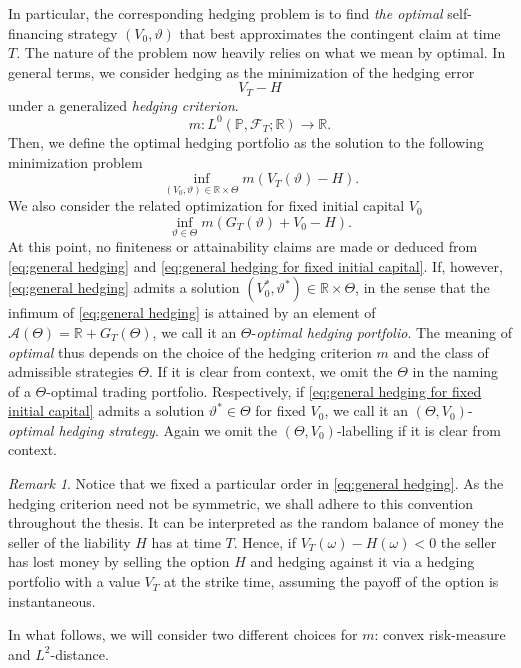 \documentclass[11pt,a4paper,twoside,openany]{report}
\numberwithin{equation}{section}
\theoremstyle{plain} %
\theoremstyle{definition} %
\theoremstyle{remark} %
\newtheorem{remark}[theorem]{Remark}
\begin{document}
In particular, the corresponding hedging problem is to find \textit{the optimal} self-financing strategy \((V_0,\vartheta)\) that best approximates the contingent claim at time \(T\). The nature of the problem now heavily relies on what we mean by optimal. In general terms, we consider hedging as the minimization of the hedging error 
\begin{equation*}
    V_T-H
\end{equation*}
under a generalized \textit{hedging criterion}.
\begin{equation*}
    m: L^0(\mathbb{P},\mathcal{F}_T;\mathbb{R})\to\mathbb{R}.
\end{equation*}
Then, we define the optimal hedging portfolio as the solution to the following minimization problem
\begin{equation}\label{eq:general hedging}
    \inf_{(V_0,\vartheta)\in\mathbb{R}\times\Theta}m(V_T(\vartheta)-H).
\end{equation}
We also consider the related optimization for fixed initial capital \(V_0\)
\begin{equation}\label{eq:general hedging for fixed initial capital}
    \inf_{\vartheta\in \Theta}m(G_T(\vartheta)+V_0-H).
\end{equation}
At this point, no finiteness or attainability claims are made or deduced from \eqref{eq:general hedging} and \eqref{eq:general hedging for fixed initial capital}. If, however, \eqref{eq:general hedging} admits a solution \((V_0^*,\vartheta^*)\in\mathbb{R}\times \Theta\), in the sense that the infimum of \eqref{eq:general hedging} is attained by an element of \(\mathcal{A}(\Theta)=\mathbb{R}+G_T(\Theta)\), we call it an \(\Theta\)-\textit{optimal hedging portfolio}. The meaning of \textit{optimal} thus depends on the choice of the hedging criterion \(m\) and the class of admissible strategies \(\Theta\). If it is clear from context, we omit the \(\Theta\) in the naming of a \(\Theta\)-optimal trading portfolio. Respectively, if \eqref{eq:general hedging for fixed initial capital} admits a solution \(\vartheta^*\in\Theta\) for fixed \(V_0\), we call it an \((\Theta,V_0)\)-\textit{optimal hedging strategy}. Again we omit the \((\Theta,V_0)\)-labelling if it is clear from context.

\begin{remark}
Notice that we fixed a particular order in \eqref{eq:general hedging}. As the hedging criterion need not be symmetric, we shall adhere to this convention throughout the thesis. It can be interpreted as the random balance of money the seller of the liability \(H\) has at time \(T\). Hence, if \(V_T(\omega)-H(\omega)<0\) the seller has lost money by selling the option \(H\) and hedging against it via a hedging portfolio with a value \(V_T\) at the strike time, assuming the payoff of the option is instantaneous.
\end{remark}
In what follows, we will consider two different choices for \(m\): convex risk-measure and \(L^2\)-distance.
\end{document}
